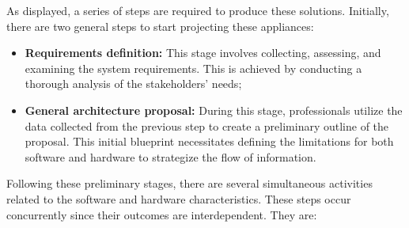 As displayed, a series of steps are required to produce these solutions. Initially, there are two general steps to start projecting these appliances:

\begin{itemize}
    \item \textbf{Requirements definition:} This stage involves collecting, assessing, and examining the system requirements. This is achieved by conducting a thorough analysis of the stakeholders' needs;
    
    \item \textbf{General architecture proposal:} During this stage, professionals utilize the data collected from the previous step to create a preliminary outline of the proposal. This initial blueprint necessitates defining the limitations for both software and hardware to strategize the flow of information.
\end{itemize}

Following these preliminary stages, there are several simultaneous activities related to the software and hardware characteristics. These steps occur concurrently since their outcomes are interdependent. They are:

